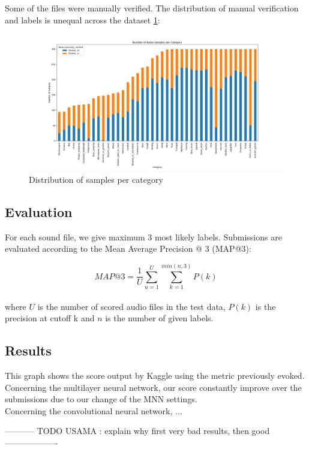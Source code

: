 \documentclass{article} %
\begin{document}
		Some of the files were manually verified. The distribution of manual verification and labels is unequal across the dataset \ref{fig:category_distribution}:
		\begin{figure}[H]
		  \includegraphics[width=\linewidth]{../midterm/category_distribution.png}
		  \caption{Distribution of samples per category}
		  \label{fig:category_distribution}
		\end{figure}


	\subsection{Evaluation}
		For each sound file, we give maximum 3 most likely labels.
		Submissions are evaluated according to the Mean Average Precision @ 3 (MAP@3):

		$$MAP@3 = \frac{1}{U} \displaystyle\sum_{u=1}^U \displaystyle\sum_{k=1}^{min(n,3)}P(k)$$\\

		where $U$ is the number of scored audio files in the test data, $P(k)$ is the precision at cutoff k and $n$ is the number of given labels.

	\subsection{Results}

		This graph shows the score output by Kaggle using the metric previously evoked.\\
		Concerning the multilayer neural network, our score constantly improve over the submissions due to our change of the MNN settings.\\
		Concerning the convolutional neural network, ...

		----------- TODO USAMA : explain why first very bad results, then good -------------------
\end{document}
